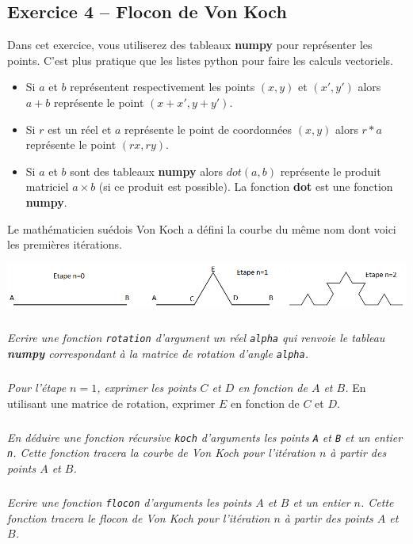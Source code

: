 \documentclass[10pt,fleqn]{book} %
\begin{document}
\begin{multicols}{2}
\section*{Exercice 4 -- Flocon de Von Koch}
\setcounter{exo}{0}


Dans cet exercice, vous utiliserez des tableaux \textbf{numpy} pour représenter les points. C'est plus pratique que les 
listes python pour faire les calculs vectoriels.

\begin{itemize}
\item Si $a$ et $b$ représentent respectivement les points $(x,y)$ et $(x',y')$ alors $a+b$ représente le point 
$(x+x',y+y')$.
\item Si $r$ est un réel et $a$ représente le point de coordonnées $(x,y)$ alors $r*a$ représente le point $(rx,ry)$.
\item Si $a$ et $b$ sont des tableaux \textbf{numpy} alors $dot(a,b)$ représente le produit matriciel $a\times b$ (si ce 
produit est possible). La fonction \textbf{dot} est une fonction \textbf{numpy}.
\end{itemize}

Le mathématicien suédois Von Koch a défini la courbe du même nom dont voici les premières itérations.

\begin{center}
\includegraphics[width=.95\linewidth]{images/etapes_flocon}
\end{center}

\subparagraph{}
\textit{Ecrire une fonction \texttt{rotation} d'argument un réel \texttt{alpha} qui renvoie le tableau \textbf{numpy} 
correspondant à la matrice de rotation d'angle \texttt{alpha}.}

\subparagraph{}
\textit{Pour l'étape $n=1$, exprimer les points $C$ et $D$ en fonction de $A$ et $B$.}
En utilisant une matrice de rotation, exprimer $E$ en fonction de $C$ et $D$.

\subparagraph{}
\textit{En déduire une fonction récursive \texttt{koch} d'arguments les points \texttt{A} et \texttt{B} et un entier 
\texttt{n}. Cette fonction tracera la courbe de Von Koch pour l'itération $n$ à partir des points $A$ et $B$.}

\subparagraph{}
\textit{Ecrire une fonction \texttt{flocon} d'arguments les points $A$ et $B$ et un entier $n$. Cette fonction tracera 
le flocon de Von Koch pour l'itération $n$ à partir des points $A$ et $B$.}


\end{multicols}
\end{document}

